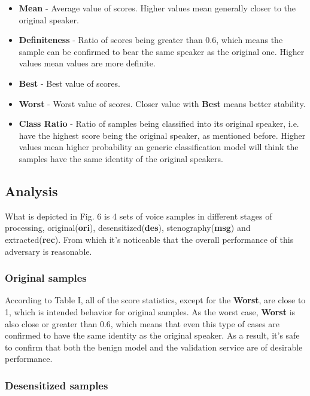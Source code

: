 \documentclass[journal]{IEEEtran} %
\begin{document}
\begin{CJK*}{UTF8}{gbsn}
\begin{itemize}
    \item \textbf{Mean} - Average value of scores. Higher values mean generally closer to the original speaker.
    \item \textbf{Definiteness} - Ratio of scores being greater than 0.6, which means the sample can be confirmed to bear the same speaker as the original one. Higher values mean values are more definite.
    \item \textbf{Best} - Best value of scores.
    \item \textbf{Worst} - Worst value of scores. Closer value with \textbf{Best} means better stability.
    \item \textbf{Class Ratio} - Ratio of samples being classified into its original speaker, i.e. have the highest score being the original speaker, as mentioned before. Higher values mean higher probability an generic classification model will think the samples have the same identity of the original speakers.
\end{itemize}

\subsection{Analysis}



What is depicted in Fig. 6 is 4 sets of voice samples in different stages of processing, original(\textbf{ori}), desensitized(\textbf{des}), stenography(\textbf{msg}) and extracted(\textbf{rec}). From which it's noticeable that the overall performance of this adversary is reasonable.

\subsubsection{Original samples}

According to Table I, all of the score statistics, except for the \textbf{Worst}, are close to 1, which is intended behavior for original samples. As the worst case, \textbf{Worst} is also close or greater than 0.6, which means that even this type of cases are confirmed to have the same identity as the original speaker. As a result, it's safe to confirm that both the benign model and the validation service are of desirable performance.

\subsubsection{Desensitized samples}


\end{CJK*}
\end{document}

